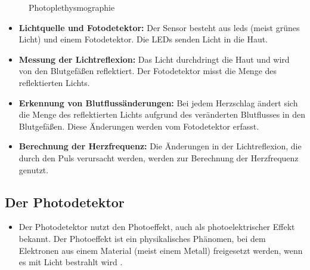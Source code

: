 {\begin{figure}[h]

        \caption{Photoplethysmographie}
        \label{fig:Photoplethysmographie}	
    \end{figure}
    
    \begin{itemize}
        \item \textbf{Lichtquelle und Fotodetektor:} Der Sensor besteht aus \ac{led}s (meist grünes Licht) und einem Fotodetektor. Die LEDs senden Licht in die Haut.
        \item \textbf{Messung der Lichtreflexion:} Das Licht durchdringt die Haut und wird von den Blutgefäßen reflektiert. Der Fotodetektor misst die Menge des reflektierten Lichts.
        \item \textbf{Erkennung von Blutflussänderungen:} Bei jedem Herzschlag ändert sich die Menge des reflektierten Lichts aufgrund des veränderten Blutflusses in den Blutgefäßen. Diese Änderungen werden vom Fotodetektor erfasst.
        \item \textbf{Berechnung der Herzfrequenz:} Die Änderungen in der Lichtreflexion, die durch den Puls verursacht werden, werden zur Berechnung der Herzfrequenz genutzt.
    \end{itemize}
    
    \subsection{Der Photodetektor}
    
    \begin{itemize}[label={}]
        \item Der Photodetektor nutzt den Photoeffekt, auch als photoelektrischer Effekt bekannt. Der Photoeffekt ist ein physikalisches Phänomen, bei dem Elektronen aus einem Material (meist einem Metall) freigesetzt werden, wenn es mit Licht bestrahlt wird \cite{Traenkler:2014}.
        
        
        \begin{figure}[h]
            \centering
\end{figure}
\end{itemize}}
